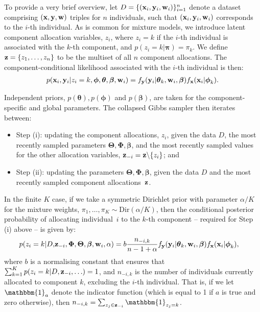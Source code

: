 \documentclass[12pt]{article}
\begin{document}
To provide a very brief overview, let $D = \{({\bf x}_i, {\bf y}_i, {\bf w}_i) \}_{i=1}^n$ denote a dataset comprising $({\bf x}, {\bf y}, {\bf w})$ triples for $n$ individuals, such that $({\bf x}_i, {\bf y}_i, {\bf w}_i)$ corresponds to the $i$-th individual.   As is common for mixture models, we introduce latent component allocation variables, $z_i$, where $z_i = k$ if the $i$-th individual is associated with the $k$-th component, and $p(z_i = k| \boldsymbol{\pi}) = \pi_k$.  We define ${\bf z} = \{ z_1, \ldots, z_n\}$ to be the multiset of all $n$ component allocations.  The component-conditional likelihood associated with the $i$-th individual is then:
\begin{align}
p({\bf x}_i,\mathbf{y}_i |z_i = k, \boldsymbol{\phi}, \boldsymbol{\theta}, \boldsymbol{\beta}, {\bf w}_i) = f_{\bf y}({\bf y}_i|\boldsymbol{\theta}_k, {\bf w}_i, \boldsymbol{ \beta})f_{\bf x}({\bf x}_i | \boldsymbol{\phi}_{k}).
\end{align}

Independent priors, $p(\boldsymbol{\theta}), p(\boldsymbol{\phi})$ and $p(\boldsymbol{\beta})$, are taken for the component-specific and global parameters.  The collapsed Gibbs sampler then iterates between: 
\begin{itemize}
\item Step (i): updating the component allocations, $z_i$, given the data $D$, the most recently sampled parameters $\boldsymbol{\Theta}, \boldsymbol{\Phi},\boldsymbol{\beta}$, and the most recently sampled values for the other allocation variables, ${\bf z}_{-i}= {\bf z}\backslash \{ z_i\}$; and 
\item Step (ii): updating the parameters $\boldsymbol{\Theta}, \boldsymbol{\Phi},\boldsymbol{\beta}$, given the data $D$ and the most recently sampled component allocations~${\bf z}$.  
\end{itemize}

In the finite $K$ case, if we take a symmetric Dirichlet prior with parameter $\alpha/K$ for the mixture weights, $\pi_1, \ldots, \pi_K \sim \mbox{Dir}(\alpha/K)$, then the conditional posterior probability of allocating individual~$i$ to the $k$-th component -- required for Step (i) above -- is given by:
\begin{align}
p(z_i=k |D,&{\bf z}_{-i}, \boldsymbol{\Phi}, \boldsymbol{\Theta}, \boldsymbol{\beta}, {\bf w}_i, \alpha) = b\frac{n_{-i,k}}{n - 1 + \alpha} f_{\bf y}({\bf y}_i|\boldsymbol{\theta}_k, {\bf w}_i, \boldsymbol{ \beta})f_{\bf x}({\bf x}_i | \boldsymbol{\phi}_{k}), \label{mycond1}
\end{align}
where $b$ is a normalising constant that ensures that $\sum_{k = 1}^K p(z_i=k |D,{\bf z}_{-i}, \ldots) = 1$, and $n_{-i,k}$ is the number of individuals currently allocated to component $k$, excluding the $i$-th individual.  That is, if we let $\mathbbm{1}_a$ denote the indicator function (which is equal to 1 if $a$ is true and zero otherwise), then $n_{-i,k} = \sum_{z_j \in {\bf z}_{-i}}\mathbbm{1}_{z_j = k}$. 
\end{document}
